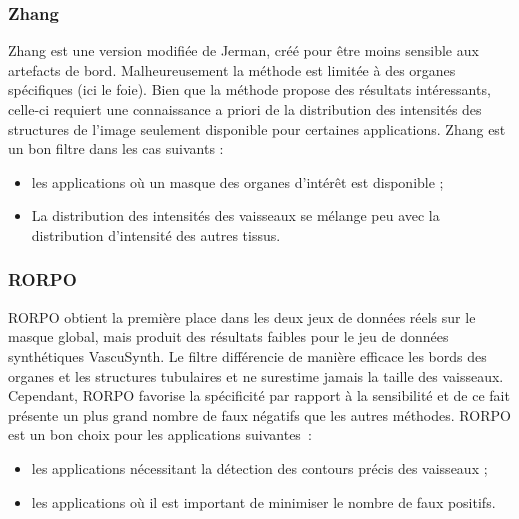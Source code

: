 \subsubsection*{Zhang}
Zhang est une version modifiée de Jerman, créé pour être moins sensible aux artefacts de bord. Malheureusement la méthode est limitée à des organes spécifiques (ici le  foie). Bien que la méthode propose des résultats intéressants, celle-ci requiert une connaissance a priori de la distribution des intensités des structures de l'image seulement disponible pour certaines applications. Zhang est un bon filtre dans les cas suivants :
\begin{itemize}
\item les applications où un masque des organes d'intérêt est disponible ;
\item La distribution des intensités des vaisseaux se mélange peu avec la distribution d'intensité des autres tissus.
\end{itemize}
\subsubsection*{RORPO}
RORPO obtient la première place dans les deux jeux de données réels sur le masque global, mais produit des résultats faibles pour le jeu de données synthétiques VascuSynth. Le filtre différencie de manière efficace les bords des organes et les structures tubulaires et ne surestime jamais la taille des vaisseaux. Cependant, RORPO favorise la spécificité par rapport à la sensibilité et de ce fait présente un plus grand nombre de faux négatifs que les autres méthodes. RORPO est un bon choix pour les applications suivantes~:
\begin{itemize}
  \item les applications nécessitant la détection des contours précis des vaisseaux ;
  \item les applications où il est important de minimiser le nombre de faux positifs. 
\end{itemize}
